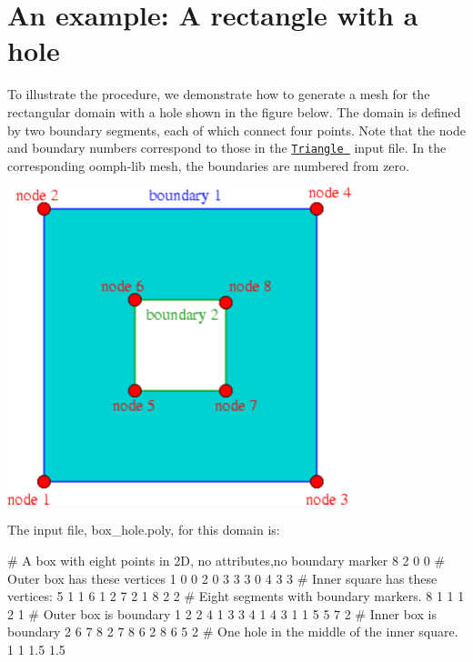  

\hypertarget{index_example}{}\section{An example\+: A rectangle with a hole}\label{index_example}
To illustrate the procedure, we demonstrate how to generate a mesh for the rectangular domain with a hole shown in the figure below. The domain is defined by two boundary segments, each of which connect four points. Note that the node and boundary numbers correspond to those in the \href{http://www.cs.cmu.edu/~quake/triangle.html}{\tt {\ttfamily Triangle} } input file. In the corresponding {\ttfamily oomph-\/lib} mesh, the boundaries are numbered from zero.

 
\begin{DoxyImage}
\includegraphics[width=0.75\textwidth]{box_hole}
\end{DoxyImage}


The input file, {\ttfamily box\+\_\+hole.\+poly}, for this domain is\+: 
\begin{DoxyCodeInclude}
# A box with eight points in 2D, no attributes,no boundary marker
8 2 0 0
# Outer box has these vertices
1 0 0 
2 0 3 
3 3 0 
4 3 3 
# Inner square has these vertices:
5 1 1 
6 1 2 
7 2 1 
8 2 2 
# Eight segments with boundary markers.
8 1 
1 1 2 1      # Outer box is boundary 1
2 2 4 1      
3 3 4 1      
4 3 1 1      
5 5 7 2      # Inner box is boundary 2
6 7 8 2 
7 8 6 2
8 6 5 2
# One hole in the middle of the inner square.
1
1 1.5 1.5 
\end{DoxyCodeInclude}


